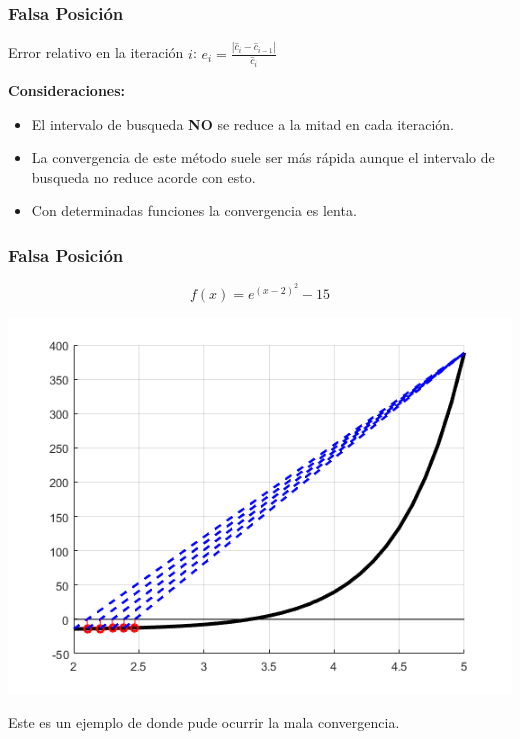 \documentclass[xcolor=svgnames]{beamer} %
\theoremstyle{plain}
\renewcommand{\textbf}[1]{{\bfseries\textcolor{redUnq2}{#1}}}
\theoremstyle{definition}
\begin{document}
\begin{frame}
\frametitle{Falsa Posición}

Error relativo en la iteración $i$: $e_i = \frac{|\hat c_i-\hat c_{i-1}|}{\hat c_i} $



\textbf{Consideraciones:}
\begin{itemize}
  \item El intervalo de busqueda \textbf{NO} se reduce a la mitad en cada iteración.
  \pause
  \item La convergencia de este método suele ser más rápida aunque el intervalo de   busqueda no reduce acorde con esto.
  \pause
  \item Con determinadas funciones la convergencia es lenta.
\end{itemize}

\end{frame}


\begin{frame}
\frametitle{Falsa Posición}

$$f(x) = e^{ (x-2)^2} - 15 $$
\begin{minipage}{.55\linewidth}
\includegraphics[scale=.45]{FalsaPosicion/malaConvergencia.png}
\end{minipage}
\begin{minipage}{.4\linewidth}
Este es un ejemplo de donde pude ocurrir la mala convergencia.


\end{minipage}

\end{frame}
\end{document}
